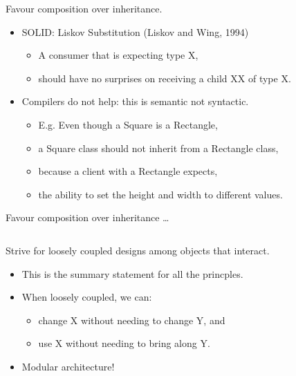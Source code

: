 \documentclass{beamer}
\begin{document}
\begin{frame}{Favour composition over inheritance.}
    \begin{itemize}
        \item SOLID: Liskov Substitution (Liskov and Wing, 1994)
            \begin{itemize}
                \item A consumer that is expecting type X, 
                \item should have no surprises on receiving a child XX of type X.
            \end{itemize}
        \item Compilers do not help: this is semantic not syntactic.
            \begin{itemize}
                \item E.g. Even though a Square is a Rectangle,
                \item a Square class should not inherit from a Rectangle class,
                \item because a client with a Rectangle expects,
                \item the ability to set the height and width to different values.
            \end{itemize}
    \end{itemize}
\end{frame}

\begin{frame}{Favour composition over inheritance \ldots}
    \vspace{0cm}
    \begin{columns}
        \column{\dimexpr\paperwidth-40pt}
        
    \end{columns}
\end{frame}

\begin{frame}{Strive for loosely coupled designs among objects that interact.}
    \begin{itemize}
        \item This is the summary statement for all the princples.
        \item When loosely coupled, we can:
            \begin{itemize}
                \item change X without needing to change Y, and
                \item use X without needing to bring along Y.
            \end{itemize}
        \item Modular architecture!
    \end{itemize}
\end{frame}
\end{document}
